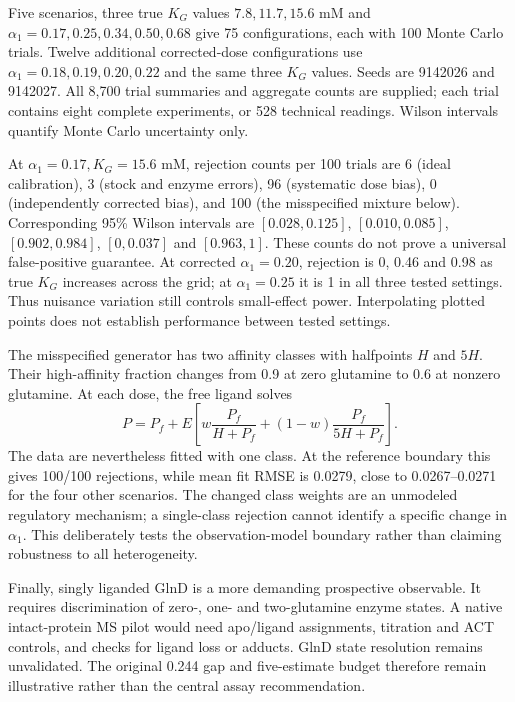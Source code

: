 \documentclass[11pt]{article}
\begin{document}
Five scenarios, three true $K_G$ values $7.8,11.7,15.6$ mM and $\alpha_1=0.17,0.25,0.34,0.50,0.68$ give 75 configurations, each with 100 Monte Carlo trials. Twelve additional corrected-dose configurations use $\alpha_1=0.18,0.19,0.20,0.22$ and the same three $K_G$ values. Seeds are 9142026 and 9142027. All 8,700 trial summaries and aggregate counts are supplied; each trial contains eight complete experiments, or 528 technical readings. Wilson intervals quantify Monte Carlo uncertainty only.

At $\alpha_1=0.17,K_G=15.6$ mM, rejection counts per 100 trials are 6 (ideal calibration), 3 (stock and enzyme errors), 96 (systematic dose bias), 0 (independently corrected bias), and 100 (the misspecified mixture below). Corresponding 95\% Wilson intervals are $[0.028,0.125]$, $[0.010,0.085]$, $[0.902,0.984]$, $[0,0.037]$ and $[0.963,1]$. These counts do not prove a universal false-positive guarantee. At corrected $\alpha_1=0.20$, rejection is 0, 0.46 and 0.98 as true $K_G$ increases across the grid; at $\alpha_1=0.25$ it is 1 in all three tested settings. Thus nuisance variation still controls small-effect power. Interpolating plotted points does not establish performance between tested settings.

The misspecified generator has two affinity classes with halfpoints $H$ and $5H$. Their high-affinity fraction changes from 0.9 at zero glutamine to 0.6 at nonzero glutamine. At each dose, the free ligand solves
\[
 P=P_f+E\left[w\frac{P_f}{H+P_f}+(1-w)\frac{P_f}{5H+P_f}\right].
\]
The data are nevertheless fitted with one class. At the reference boundary this gives 100/100 rejections, while mean fit RMSE is 0.0279, close to 0.0267--0.0271 for the four other scenarios. The changed class weights are an unmodeled regulatory mechanism; a single-class rejection cannot identify a specific change in $\alpha_1$. This deliberately tests the observation-model boundary rather than claiming robustness to all heterogeneity.

Finally, singly liganded GlnD is a more demanding prospective observable. It requires discrimination of zero-, one- and two-glutamine enzyme states. A native intact-protein MS pilot would need apo/ligand assignments, titration and ACT controls, and checks for ligand loss or adducts. GlnD state resolution remains unvalidated. The original 0.244 gap and five-estimate budget therefore remain illustrative rather than the central assay recommendation.
\end{document}

